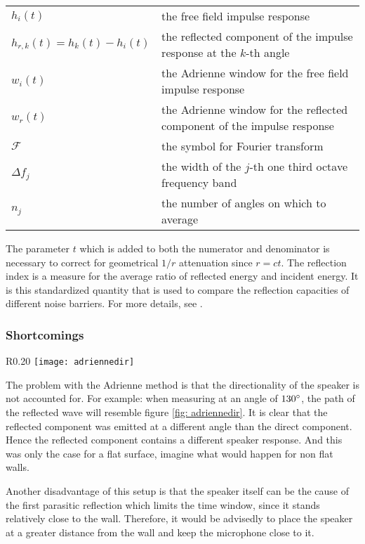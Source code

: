 \begin{tabular}{ll}
$h_i(t)$ & the free field impulse response \\
$h_{r,k}(t) = h_k(t) - h_i(t)$ & the reflected component of the impulse response at the $k$-th angle \\
$w_i(t)$ & the Adrienne window for the free field impulse response\\ 
$w_r(t)$ & the Adrienne window for the reflected component of the impulse response\\ 
$\mathcal{F}$ & the symbol for Fourier transform \\
$\Delta f_j$ & the width of the $j$-th one third octave frequency band\\
$n_j$ & the number of angles on which to average\\ 
\end{tabular}

The parameter $t$ which is added to both the numerator and denominator is necessary to correct for geometrical $1/r$ attenuation since $r =c t$. 
The reflection index is a measure for the average ratio of reflected energy and incident energy. It is this standardized quantity that is used to compare the reflection capacities of different noise barriers. For more details, see \cite{Adrienne}.

\subsubsection{Shortcomings}
\begin{wrapfigure}{R}{0.20\textwidth}
	\vspace{-10pt}
  \centering
    \texttt{[image: adriennedir]}
  \caption{Path of the reflected wave.}
  \label{fig: adriennedir}
\end{wrapfigure}
The problem with the Adrienne method is that the directionality of the speaker is not accounted for. For example: when measuring at an angle of $130^{\circ}$, the path of the reflected wave will resemble figure \ref{fig: adriennedir}. It is clear that the reflected component was emitted at a different angle than the direct component. Hence the reflected component contains a different speaker response. And this was only the case for a flat surface, imagine what would happen for non flat walls.

Another disadvantage of this setup is that the speaker itself can be the cause of the first parasitic reflection which limits the time window, since it stands relatively close to the wall. Therefore, it would be advisedly to place the speaker at a greater distance from the wall and keep the microphone close to it.


